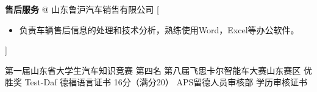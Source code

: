 \documentclass[zh]{resume}
\begin{document}
\begin{spacing}{1.6}
\begin{experiences}
	{{\large \textbf{售后服务} @ 山东鲁沪汽车销售有限公司}}%
	[\begin{itemize}
		\item {\large 负责车辆售后信息的处理和技术分析，熟练使用Word，Excel等办公软件。}
	\end{itemize}]
\end{experiences}
	\end{spacing}
\begin{spacing}{1.6}
\begin{entries}
	{{\large 第一届山东省大学生汽车知识竞赛 \textbullet 第四名}}
	{{\large 第八届飞思卡尔智能车大赛山东赛区 \textbullet 优胜奖} }
	{{\large Test-Daf 德福语言证书 \textbullet 16分（满分20}）}
	{{\large APS留德人员审核部 \textbullet 学历审核证书}}
\end{entries}
		\end{spacing}
\end{document}
